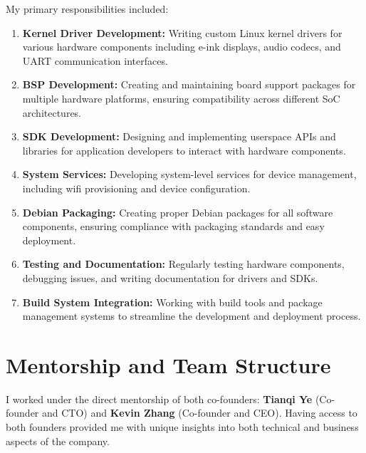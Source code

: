 \documentclass[12pt,a4paper]{report}
\begin{document}
\vspace{0.3cm}

My primary responsibilities included:

\begin{enumerate}[itemsep=0.3cm]
    \item \textbf{Kernel Driver Development:} Writing custom Linux kernel drivers for various hardware components including e-ink displays, audio codecs, and UART communication interfaces.

    \item \textbf{BSP Development:} Creating and maintaining board support packages for multiple hardware platforms, ensuring compatibility across different SoC architectures.

    \item \textbf{SDK Development:} Designing and implementing userspace APIs and libraries for application developers to interact with hardware components.

    \item \textbf{System Services:} Developing system-level services for device management, including wifi provisioning and device configuration.

    \item \textbf{Debian Packaging:} Creating proper Debian packages for all software components, ensuring compliance with packaging standards and easy deployment.

    \item \textbf{Testing and Documentation:} Regularly testing hardware components, debugging issues, and writing documentation for drivers and SDKs.

    \item \textbf{Build System Integration:} Working with build tools and package management systems to streamline the development and deployment process.
\end{enumerate}

\section{Mentorship and Team Structure}

I worked under the direct mentorship of both co-founders: \textbf{Tianqi Ye} (Co-founder and CTO) and \textbf{Kevin Zhang} (Co-founder and CEO). Having access to both founders provided me with unique insights into both technical and business aspects of the company.

\vspace{0.3cm}
\end{document}
